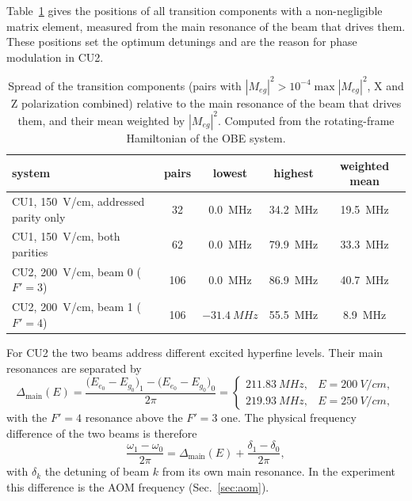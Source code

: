 \documentclass[11pt,a4paper,oneside]{report}
\newcommand{\Dmain}{\Delta_{\mathrm{main}}}
\begin{document}
Table~\ref{tab:spread} gives the positions of all transition components with a
non-negligible matrix element, measured from the main resonance of the beam that drives them.
These positions set the optimum detunings and are the reason for phase modulation in CU2.

\begin{table}[htbp]
  \centering
  \caption[Spread of the transition components in the applied field]{Spread of the
  transition components (pairs with $|M_{eg}|^2>10^{-4}\max|M_{eg}|^2$, X and Z polarization
  combined) relative to the main resonance of the beam that drives them, and their mean
  weighted by $|M_{eg}|^2$. Computed from the rotating-frame Hamiltonian of the OBE system.}
  \label{tab:spread}
  \small
  \begin{tabular}{lcccc}
    \toprule
    system & pairs & lowest & highest & weighted mean \\
    \midrule
    CU1, \SI{150}{V/cm}, addressed parity only & 32 & \SI{0.0}{MHz} & \SI{34.2}{MHz} & \SI{19.5}{MHz} \\
    CU1, \SI{150}{V/cm}, both parities & 62 & \SI{0.0}{MHz} & \SI{79.9}{MHz} & \SI{33.3}{MHz} \\
    CU2, \SI{200}{V/cm}, beam 0 ($F'=3$) & 106 & \SI{0.0}{MHz} & \SI{86.9}{MHz} & \SI{40.7}{MHz} \\
    CU2, \SI{200}{V/cm}, beam 1 ($F'=4$) & 106 & $-\SI{31.4}{MHz}$ & \SI{55.5}{MHz} & \SI{8.9}{MHz} \\
    \bottomrule
  \end{tabular}
\end{table}

For CU2 the two beams address different excited hyperfine levels. Their main resonances are
separated by
\begin{equation}
  \Dmain(E)=\frac{\bigl(E_{e_0}-E_{g_0}\bigr)_1-\bigl(E_{e_0}-E_{g_0}\bigr)_0}{2\pi}
  =\begin{cases}\SI{211.83}{MHz}, & E=\SI{200}{V/cm},\\ \SI{219.93}{MHz}, & E=\SI{250}{V/cm},\end{cases}
  \label{eq:dmain}
\end{equation}
with the $F'=4$ resonance above the $F'=3$ one. The physical frequency difference of the two
beams is therefore
\begin{equation}
  \frac{\omega_1-\omega_0}{2\pi}=\Dmain(E)+\frac{\delta_1-\delta_0}{2\pi},
  \label{eq:laser_separation}
\end{equation}
with $\delta_k$ the detuning of beam $k$ from its own main resonance. In the experiment this
difference is the AOM frequency (Sec.~\ref{sec:aom}).
\end{document}

